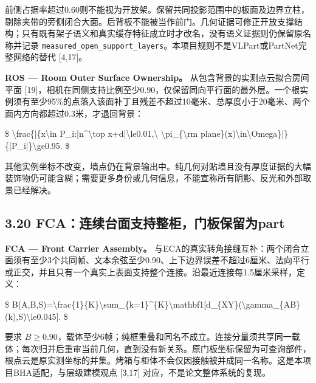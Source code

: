 \documentclass[UTF8,fontset=fandol]{ctexart}
\begin{document}
前侧占据率超过0.60则不能视为开放架。保留共同投影范围中的板面及边界立柱，剔除夹带的旁侧闭合大面。后背板不能被当作前门。几何证据可修正开放支撑结构；只有既有架子语义和真实缓存特征成立时才改名，没有语义证据则仍保留原名称并记录 \texttt{measured\_\allowbreak{}open\_\allowbreak{}support\_\allowbreak{}layers}。本项目规则不是VLPart或PartNet完整网络的替代 [4,17]。



\textbf{ROS — Room Outer Surface Ownership。} 从包含背景的实测点云拟合房间平面 [19]，相机在同侧支持比例至少0.90，仅保留同向平行面的最外层。一个根实例须有至少95\%的点落入该面补丁且残差不超过10毫米、总厚度小于20毫米、两个面内方向都超过0.3米，才退回背景：



\$
\textbackslash{}frac\{|\{x\textbackslash{}in P\_i:|n\textasciicircum{}\textbackslash{}top x+d|\textbackslash{}le0.01,\textbackslash{} \textbackslash{}pi\_\{\textbackslash{}rm plane\}(x)\textbackslash{}in\textbackslash{}Omega\}|\}\{|P\_i|\}\textbackslash{}ge0.95.
\$



其他实例坐标不改变，墙点仍在背景输出中。纯几何对贴墙且没有厚度证据的大幅装饰物仍可能含糊；需要更多身份或几何信息，不能宣称所有阴影、反光和外部取景已经解决。



\subsection*{3.20 FCA：连续台面支持整柜，门板保留为part}

\textbf{FCA — Front Carrier Assembly。} 与ECA的真实转角接缝互补：两个闭合立面须有至少3个共同帧、文本余弦至少0.90、上下边界误差不超过6厘米、法向平行或正交，并且只有一个真实上表面支持整个连接。沿最近连接每1.5厘米采样，定义：



\$
B(A,B,S)=\textbackslash{}frac\{1\}\{K\}\textbackslash{}sum\_\{k=1\}\textasciicircum{}\{K\}\textbackslash{}mathbf1[d\_\{XY\}(\textbackslash{}gamma\_\{AB\}(k),S)\textbackslash{}le0.045].
\$



要求 $B\ge0.90$，载体至少6帧；纯框重叠和同名不成立。连接分量须共享同一载体；每次归并后重审当前几何，直到没有新关系。原门板坐标保留为可查询部件，根点云是原实测坐标的并集。烤箱与柜体不会仅因接触被并成同一名称。这是本项目BHA适配，与层级建模观点 [3,17] 对应，不是论文整体系统的复现。
\end{document}
